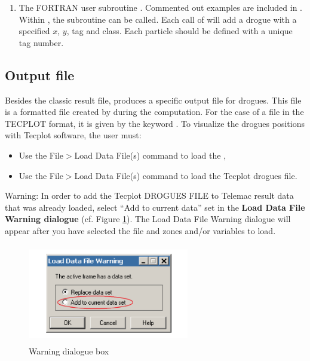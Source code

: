 \begin{enumerate}
\item The FORTRAN user subroutine .
Commented out examples are included in .
Within , the subroutine 
can be called.
Each call of  will add a drogue with a specified
$x$, $y$, tag and class.
Each particle should be defined with a unique tag number.
\end{enumerate}

\subsection{Output file}
\label{subs:drog:output:file}
Besides the classic result file,  produces a specific output file
for drogues.
This file is a formatted file created by  during the computation.
For the case of a file in the TECPLOT format, it is given by the keyword
.
To visualize the drogues positions with Tecplot software, the user must:

\begin{itemize}
\item Use the File$>$Load Data File(s) command to load the ,

\item Use the File$>$Load Data File(s) command to load the Tecplot drogues file.
\end{itemize}

\begin{WarningBlock}{Warning:}
In order to add the Tecplot DROGUES FILE to Telemac result data that was already
loaded, select ``Add to current data'' set in the
\textbf{Load Data File Warning dialogue} (cf. Figure \ref{fig:load:df}).
The Load Data File Warning dialogue will appear after you have selected the file
and zones and/or variables to load.
\end{WarningBlock}
\begin{figure}[!htbp]
\centering
 \includegraphics[width=2.77in, height=1.70in, keepaspectratio=false]{./graphics/warning1.png}
 \caption{Warning dialogue box}%
 \label{fig:load:df}
\end{figure}

